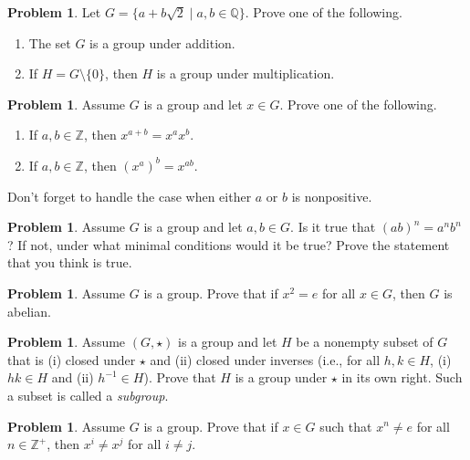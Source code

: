 \documentclass[11pt]{scrartcl}
\theoremstyle{definition}
\newtheorem{problem}[theorem]{Problem}
\begin{document}
\begin{problem}
Let $G=\{a+b\sqrt{2}\mid a,b\in\mathbb{Q}\}$.  Prove one of the following.
\begin{enumerate}[label=\rm{(\alph*)}]
\item The set $G$ is a group under addition.
\item If $H=G\setminus\{0\}$, then $H$ is a group under multiplication.
\end{enumerate}
\end{problem}

\begin{problem}
Assume $G$ is a group and let $x\in G$.  Prove one of the following.
\begin{enumerate}[label=\rm{(\alph*)}]
\item If $a,b\in\mathbb{Z}$, then $x^{a+b}=x^ax^b$.
\item If $a,b\in\mathbb{Z}$, then $(x^a)^b=x^{ab}$.
\end{enumerate}
Don't forget to handle the case when either $a$ or $b$ is nonpositive.
\end{problem}

\begin{problem}
Assume $G$ is a group and let $a,b\in G$.  Is it true that $(ab)^n=a^nb^n$?  If not, under what minimal conditions would it be true? Prove the statement that you think is true.
\end{problem}

\begin{problem}
Assume $G$ is a group. Prove that if $x^2=e$ for all $x\in G$, then $G$ is abelian.
\end{problem}

\begin{problem}
Assume $(G,\star)$ is a group and let $H$ be a nonempty subset of $G$ that is (i) closed under $\star$ and (ii) closed under inverses (i.e., for all $h,k\in H$, (i) $hk\in H$ and (ii) $h^{-1}\in H$).  Prove that $H$ is a group under $\star$ in its own right.  Such a subset is called a \emph{subgroup}.
\end{problem}

\begin{problem}
Assume $G$ is a group.  Prove that if $x\in G$ such that $x^n\neq e$ for all $n\in \mathbb{Z}^+$, then $x^i\neq x^j$ for all $i\neq j$.
\end{problem}
\end{document}
